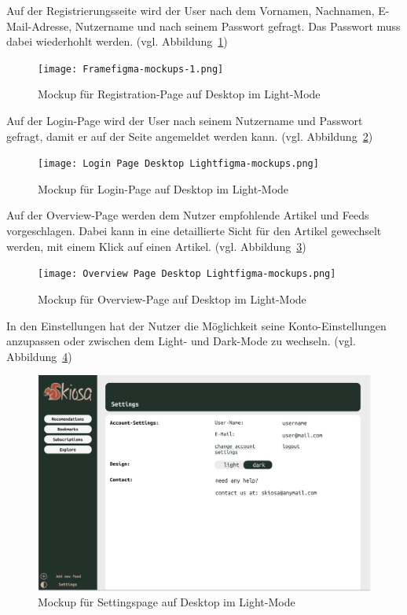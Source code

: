Auf der Registrierungsseite wird der User nach dem Vornamen, Nachnamen, E-Mail-Adresse, Nutzername und nach seinem Passwort gefragt.
Das Passwort muss dabei wiederhohlt werden. (vgl. Abbildung~\ref{fig:Registration Page Light})

\begin{figure}[H]
    \texttt{[image: Framefigma-mockups-1.png]}
    \caption{Mockup für Registration-Page auf Desktop im Light-Mode}
    \label{fig:Registration Page Light}
\end{figure}

Auf der Login-Page wird der User nach seinem Nutzername und Passwort gefragt, damit er auf der Seite angemeldet werden kann. (vgl. Abbildung~\ref{fig:Login Page Desktop Light})

\begin{figure}[H]
    \texttt{[image: Login Page Desktop Lightfigma-mockups.png]}
    \caption{Mockup für Login-Page auf Desktop im Light-Mode}
    \label{fig:Login Page Desktop Light}
\end{figure}

Auf der Overview-Page werden dem Nutzer empfohlende Artikel und Feeds vorgeschlagen. Dabei kann in eine detaillierte Sicht für den Artikel gewechselt werden, mit einem Klick auf einen Artikel. (vgl. Abbildung~\ref{fig:Overview Page Desktop Light})

\begin{figure}[H]
    \texttt{[image: Overview Page Desktop Lightfigma-mockups.png]}
    \caption{Mockup für Overview-Page auf Desktop im Light-Mode}
    \label{fig:Overview Page Desktop Light}
\end{figure}

In den Einstellungen hat der Nutzer die Möglichkeit seine Konto-Einstellungen anzupassen oder zwischen dem Light- und Dark-Mode zu wechseln. (vgl. Abbildung~\ref{fig:Settings Interface Desktop Light})

\begin{figure}[H]
    \includegraphics[width=\linewidth]{images/Settings Interface Desktop Lightfigma-mockups.png}
    \caption{Mockup für Settingspage auf Desktop im Light-Mode}
    \label{fig:Settings Interface Desktop Light}
\end{figure}

